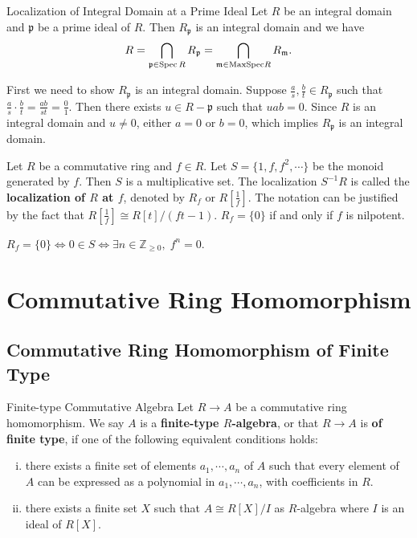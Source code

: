 \begin{proposition}{Localization of Integral Domain at a Prime Ideal}{}
    Let $R$ be an integral domain and $\mathfrak{p}$ be a prime ideal of $R$. Then $R_\mathfrak{p}$ is an integral domain and we have
    \[
    R = \bigcap_{\mathfrak{p}\in \operatorname{Spec} R} R_\mathfrak{p}= \bigcap_{\mathfrak{m}\in \mathrm{MaxSpec} R} R_\mathfrak{m}.
    \]
   
\end{proposition}
\begin{prf}
    First we need to show $R_\mathfrak{p}$ is an integral domain. Suppose $\frac{a}{s},\frac{b}{t}\in R_\mathfrak{p}$ such that $\frac{a}{s}\cdot\frac{b}{t}=\frac{ab}{st}=\frac{0}{1}$. Then there exists $u\in R-\mathfrak{p}$ such that $uab=0$. Since $R$ is an integral domain and $u\ne0$, either $a=0$ or $b=0$, which implies $R_\mathfrak{p}$ is an integral domain.\\
\end{prf}



\begin{example}{}{}
    Let $R$ be a commutative ring and $f\in R$. Let $S=\{1,f,f^2,\cdots\}$ be the monoid generated by $f$. Then $S$ is a multiplicative set. The localization $S^{-1}R$ is called the \textbf{localization of $R$ at $f$}, denoted by $R_f$ or $R\left[\tfrac{1}{f}\right]$. The notation can be justified by the fact that $R\left[\tfrac{1}{f}\right]\cong R\left[t\right]/(ft-1)$.
    $R_f=\{0\}$ if and only if $f$ is nilpotent.
\end{example}

\begin{prf}
    $R_f=\{0\}\iff 0\in S\iff \exists n\in\mathbb{Z}_{\ge0},\;f^n=0$.
\end{prf}

\section{Commutative Ring Homomorphism}

\subsection{Commutative Ring Homomorphism of Finite Type}

\begin{definition}{Finite-type Commutative Algebra}{}
    Let $R\to A$ be a commutative ring homomorphism. We say $A$ is a \textbf{finite-type $R$-algebra}, or that $R\to A$ is \textbf{of finite type}, if one of the following equivalent conditions holds:
    \begin{enumerate}[(i)]
        \item there exists a finite set of elements $a_1,\cdots,a_n$ of $A$ such that every element of $A$ can be expressed as a polynomial in $a_1,\cdots,a_n$, with coefficients in $R$.
        \item there exists a finite set $X$ such that $A\cong R[X]/I$ as $R$-algebra where $I$ is an ideal of $R[X]$.
    \end{enumerate}
    
\end{definition}


